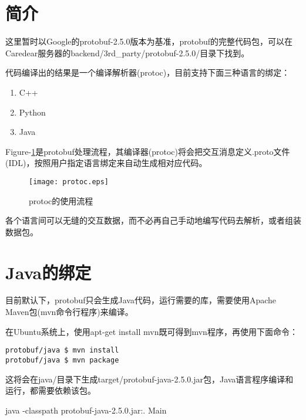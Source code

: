 \documentclass[a4paper]{article}
\title{\kai{protobuf使用}}
\author{CareDear Service Team}
\newcommand{\kai}[1]{{\KAI#1}}
\begin{document}
\maketitle

\tableofcontents

\begin{abstract}
\kai{本文档介绍Google的服务器间RPC机制－protobuf}
\end{abstract}

\section{简介}
这里暂时以Google的protobuf-2.5.0版本为基准，protobuf的完整代码包，可以在Caredear服务器的backend/3rd\_party/protobuf-2.5.0/目录下找到。

代码编译出的结果是一个编译解析器(protoc)，目前支持下面三种语言的绑定：

\begin{enumerate}
 \item C++
 \item Python
 \item Java
\end{enumerate}

Figure-\ref{figProtoc}是protobuf处理流程，其编译器(protoc)将会把交互消息定义.proto文件(IDL)，按照用户指定语言绑定来自动生成相对应代码。
\begin{figure}
\caption{protoc的使用流程}\label{figProtoc}
\centering
\texttt{[image: protoc.eps]}
\end{figure}

各个语言间可以无缝的交互数据，而不必再自己手动地编写代码去解析，或者组装数据包。

\section{Java的绑定}
目前默认下，protobuf只会生成Java代码，运行需要的库，需要使用Apache Maven包(mvn命令行程序)来编译。

在Ubuntu系统上，使用apt-get install mvn既可得到mvn程序，再使用下面命令：

\begin{lstlisting}
protobuf/java $ mvn install
protobuf/java $ mvn package
\end{lstlisting}

这将会在java/目录下生成target/protobuf-java-2.5.0.jar包，Java语言程序编译和运行，都需要依赖该包。

java -classpath protobuf-java-2.5.0.jar:. Main
\end{document}
